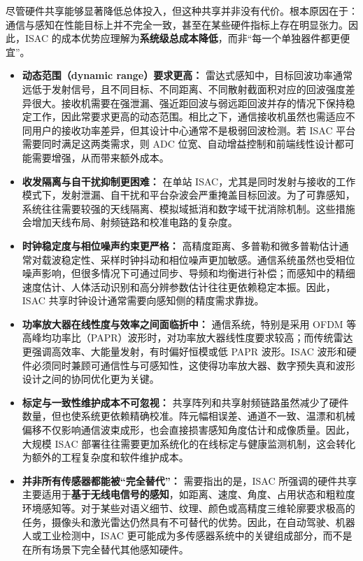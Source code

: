 尽管硬件共享能够显著降低总体投入，但这种共享并非没有代价。根本原因在于：通信与感知在性能目标上并不完全一致，甚至在某些硬件指标上存在明显张力。因此，ISAC 的成本优势应理解为\textbf{系统级总成本降低}，而非“每一个单独器件都更便宜”。
\begin{itemize}
\item \textbf{动态范围（dynamic range）要求更高：}  
雷达式感知中，目标回波功率通常远低于发射信号，且不同目标、不同距离、不同散射截面积对应的回波强度差异很大。接收机需要在强泄漏、强近距回波与弱远距回波并存的情况下保持稳定工作，因此常要求更高的动态范围。相比之下，通信接收机虽然也需适应不同用户的接收功率差异，但其设计中心通常不是极弱回波检测。若 ISAC 平台需要同时满足这两类需求，则 ADC 位宽、自动增益控制和前端线性设计都可能需要增强，从而带来额外成本\cite{Wei2023Integrated}。
\item \textbf{收发隔离与自干扰抑制更困难：}  
在单站 ISAC，尤其是同时发射与接收的工作模式下，发射泄漏、自干扰和平台杂波会严重掩盖目标回波。为了可靠感知，系统往往需要较强的天线隔离、模拟域抵消和数字域干扰消除机制。这些措施会增加天线布局、射频链路和校准电路的复杂度\cite{Sturm2011WaveformDesign, Hassanien2016signaling}。
\item \textbf{时钟稳定度与相位噪声约束更严格：}  
高精度距离、多普勒和微多普勒估计通常对载波稳定性、采样时钟抖动和相位噪声更加敏感。通信系统虽然也受相位噪声影响，但很多情况下可通过同步、导频和均衡进行补偿；而感知中的精细速度估计、人体活动识别和高分辨参数估计往往更依赖稳定本振。因此，ISAC 共享时钟设计通常需要向感知侧的精度需求靠拢\cite{Sen2013YouAreWhat}。
\item \textbf{功率放大器在线性度与效率之间面临折中：}  
通信系统，特别是采用 OFDM 等高峰均功率比（PAPR）波形时，对功率放大器线性度要求较高；而传统雷达更强调高效率、大能量发射，有时偏好恒模或低 PAPR 波形。ISAC 波形和硬件必须同时兼顾可通信性与可感知性，这使得功率放大器、数字预失真和波形设计之间的协同优化更为关键\cite{Sturm2011WaveformDesign, Hassanien2016signaling}。
\item \textbf{标定与一致性维护成本不可忽视：}  
共享阵列和共享射频链路虽然减少了硬件数量，但也使系统更依赖精确校准。阵元幅相误差、通道不一致、温漂和机械偏移不仅影响通信波束成形，也会直接损害感知角度估计和成像质量。因此，大规模 ISAC 部署往往需要更加系统化的在线标定与健康监测机制，这会转化为额外的工程复杂度和软件维护成本。
\item \textbf{并非所有传感器都能被“完全替代”：}  
需要指出的是，ISAC 所强调的硬件共享主要适用于\textbf{基于无线电信号的感知}，如距离、速度、角度、占用状态和粗粒度环境感知等。对于某些对语义细节、纹理、颜色或高精度三维轮廓要求极高的任务，摄像头和激光雷达仍然具有不可替代的优势。因此，在自动驾驶、机器人或工业检测中，ISAC 更可能成为多传感器系统中的关键组成部分，而不是在所有场景下完全替代其他感知硬件\cite{Wei2023Integrated}。
\end{itemize}

